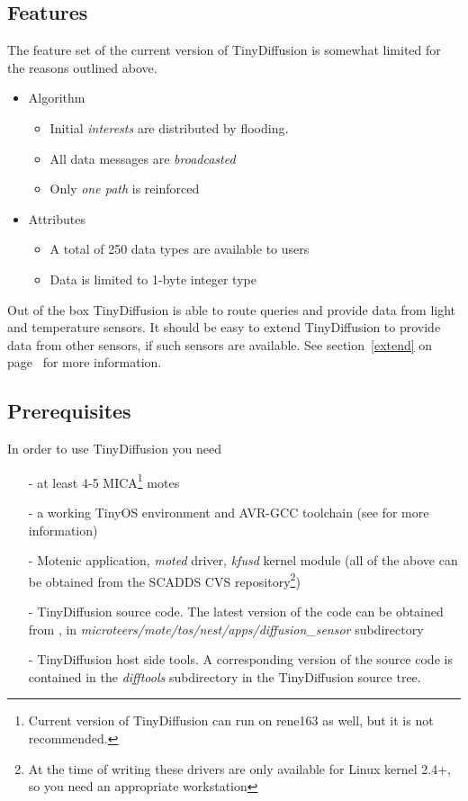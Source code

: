 \documentclass[11pt,onecolumn]{article}
\begin{document}
\subsection{Features}
The feature set of the current version of TinyDiffusion is somewhat
limited for the reasons outlined above.

\begin{itemize}
\item{Algorithm}
	\begin{itemize}
		\item Initial \emph{interests} are distributed by flooding.
		\item All data messages are \emph{broadcasted}
		\item Only \emph{one path} is reinforced 
	\end{itemize}
\item{Attributes}
	\begin{itemize}
		\item A total of 250 data types are available to users
		\item Data is limited to 1-byte integer type
	\end{itemize}
\end{itemize}

Out of the box TinyDiffusion is able to route queries and provide data
from light and temperature sensors. It should be easy to extend
TinyDiffusion to provide data from other sensors, if such sensors are
available. See section~\ref{extend} on page~\pageref{extend} for more
information.

\subsection{Prerequisites}
In order to use TinyDiffusion you need
\begin{itemize}
	\item[-] at least 4-5 MICA\footnote{Current version of
	TinyDiffusion can run on rene163 as well, but it is not
	recommended.} motes 
	\item[-] a working TinyOS environment and
	AVR-GCC toolchain (see \cite{tinyos} for more information)
	\item[-] Motenic application, \emph{moted} driver, \emph{kfusd}
	kernel module (all of the above can be obtained from the SCADDS CVS
	repository\cite{scadds}\footnote{At the time of writing these
	drivers are only available for Linux kernel 2.4+, so you need an
	appropriate workstation})
	\item[-] TinyDiffusion source code. The latest version of the code
	can be obtained from \cite{scadds}, in
	\emph{microteers/mote/tos/nest/apps/diffusion\_sensor} subdirectory 
	\item[-] TinyDiffusion host side tools. A corresponding version of
	the source code is contained in the
	\emph{difftools} subdirectory in the TinyDiffusion source tree.
\end{itemize}
\end{document}
